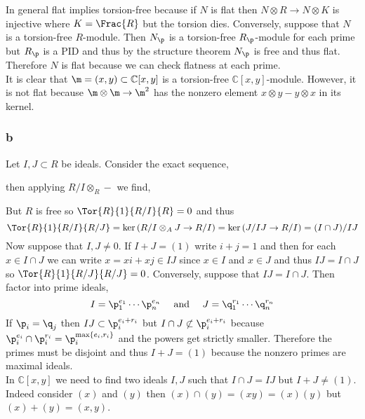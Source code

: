 \documentclass[12pt]{article}
\renewcommand{\C}{\mathbb{C}}
\begin{document}
In general flat implies torsion-free because if $N$ is flat then $N \otimes R \to N \otimes K$ is injective where $K = \Frac{R}$ but the torsion dies. Conversely, suppose that $N$ is a torsion-free $R$-module. Then $N_\p$ is a torsion-free $R_\p$-module for each prime but $R_\p$ is a PID and thus by the structure theorem $N_\p$ is free and thus flat. Therefore $N$ is flat because we can check flatness at each prime.
\bigskip\\
It is clear that $\m = (x,y) \subset \C[x,y]$ is a torsion-free $\C[x,y]$-module. However, it is not flat because $\m \otimes \m \to \m^2$ has the nonzero element $x \otimes y - y \otimes x$ in its kernel.

\subsubsection{b}

Let $I, J \subset R$ be ideals. Consider the exact sequence,
\begin{center}
\end{center}
then applying $R/I \otimes_R -$ we find,
\begin{center}
\end{center}
But $R$ is free so $\Tor{R}{1}{R/I}{R} = 0$ and thus
\[ \Tor{R}{1}{R/I}{R/J} = \ker{(R/I \otimes_A J \to R/I)} = \ker{(J/IJ \to R/I)} = (I \cap J)/IJ \]
Now suppose that $I,J \neq 0$. If $I + J = (1)$ write $i + j = 1$ and then for each $x \in I \cap J$ we can write $x = x i + x j \in IJ$ since $x \in I$ and $x \in J$ and thus $IJ = I \cap J$ so $\Tor{R}{1}{R/J}{R/J} = 0$. Conversely, suppose that $IJ = I \cap J$. Then factor into prime ideals,
\[ I = \p_1^{e_1} \cdots \p_n^{e_n} \quad \text{ and } \quad J = \q_1^{r_1} \cdots \q_n^{r_n} \]
If $\p_i = \q_j$ then $IJ \subset \p_i^{e_i + r_i}$ but $I \cap J \not\subset \p_i^{e_i + r_i}$ because $\p_i^{e_i} \cap \p_i^{r_i} = \p_i^{\max \{ e_i, r_i \}}$ and the powers get strictly smaller. Therefore the primes must be disjoint and thus $I + J = (1)$ because the nonzero primes are maximal ideals. 
\bigskip\\
In $\C[x,y]$ we need to find two ideals $I, J$ such that $I \cap J = IJ$ but $I + J \neq (1)$. Indeed consider $(x)$ and $(y)$ then $(x) \cap (y) = (xy) = (x)(y)$ but $(x) + (y) = (x,y)$.
\end{document}
